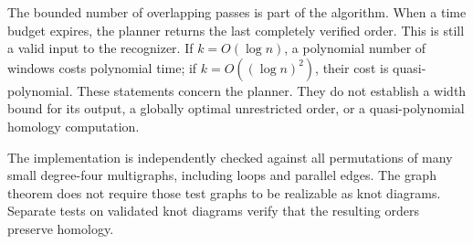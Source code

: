 The bounded number of overlapping passes is part of the algorithm. When a
time budget expires, the planner returns the last completely verified order.
This is still a valid input to the recognizer. If $k=O(\log n)$, a polynomial
number of windows costs polynomial time; if $k=O((\log n)^2)$, their cost is
quasi-polynomial. These statements concern the planner. They do not establish
a width bound for its output, a globally optimal unrestricted order, or a
quasi-polynomial homology computation.

The implementation is independently checked against all permutations of
many small degree-four multigraphs, including loops and parallel edges.
The graph theorem does not require those test graphs to be realizable as
knot diagrams. Separate tests on validated knot diagrams verify that the
resulting orders preserve homology.
